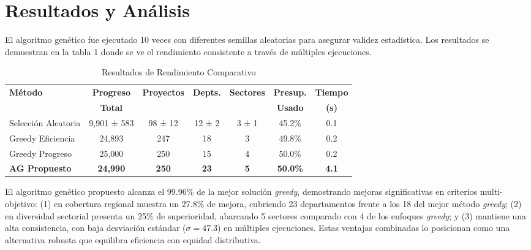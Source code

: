 \documentclass[12pt,a4paper]{article}
\begin{document}
\section{Resultados y Análisis}



El algoritmo genético fue ejecutado 10 veces con diferentes semillas aleatorias para asegurar validez estadística. Los resultados se demuestran en la tabla 1 donde se ve el rendimiento consistente a través de múltiples ejecuciones.

\begin{table}[H]
\centering
\caption{Resultados de Rendimiento Comparativo}
\label{tab:comparative_results}
\begin{tabular}{@{}lcccccc@{}}
\toprule
\textbf{Método} & \textbf{Progreso} & \textbf{Proyectos} & \textbf{Depts.} & \textbf{Sectores} & \textbf{Presup.} & \textbf{Tiempo} \\
 & \textbf{Total} &  &  &  & \textbf{Usado} & \textbf{(s)} \\
\midrule
Selección Aleatoria & 9,901 ± 583 & 98 ± 12 & 12 ± 2 & 3 ± 1 & 45.2\% & 0.1 \\
Greedy Eficiencia & 24,893 & 247 & 18 & 3 & 49.8\% & 0.2 \\
Greedy Progreso & 25,000 & 250 & 15 & 4 & 50.0\% & 0.2 \\
\textbf{AG Propuesto} & \textbf{24,990} & \textbf{250} & \textbf{23} & \textbf{5} & \textbf{50.0\%} & \textbf{4.1} \\
\bottomrule
\end{tabular}
\end{table}

El algoritmo genético propuesto alcanza el 99.96\% de la mejor solución \textit{greedy}, demostrando mejoras significativas en criterios multi-objetivo: (1) en cobertura regional muestra un 27.8\% de mejora, cubriendo 23 departamentos frente a los 18 del mejor método \textit{greedy}; (2) en diversidad sectorial presenta un 25\% de superioridad, abarcando 5 sectores comparado con 4 de los enfoques \textit{greedy}; y (3) mantiene una alta consistencia, con baja desviación estándar ($\sigma = 47.3$) en múltiples ejecuciones. Estas ventajas combinadas lo posicionan como una alternativa robusta que equilibra eficiencia con equidad distributiva.
\end{document}
